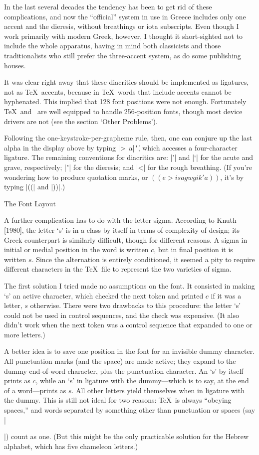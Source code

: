 In the last several decades the tendency has been to get rid of these
complications, and now the ``official'' system in use in Greece includes
only one accent and the dieresis, without breathings or iota subscripts.
Even though I work primarily with modern Greek, however, I thought
it short-sighted not to include the whole apparatus, having in mind
both classicists and those traditionalists who
still prefer the three-accent system, as do some publishing houses.

It was clear right away that these diacritics should be implemented as
ligatures, not as \TeX\ accents, because in \TeX\ words that include
accents cannot be hyphenated.  This implied that 128 font
positions were not enough.   Fortunately \TeX\ and \MF\ are
well equipped to handle 256-position fonts, though most device
drivers are not (see the section `Other Problems').

Following the one-keystroke-per-grapheme rule, then, one can conjure
up the last alpha in the display above by typing |>~a|{\tt\char`\|},
which accesses a four-character ligature.  The remaining conventions
for diacritics are: |'| and |`| for the acute and grave, respectively;
|"| for the dieresis; and |<| for the rough breathing.  (If you're
wondering how to produce quotation marks, or $((e>isagwgik'a))$,
it's by typing |((| and |))|.)

\heading The Font Layout \endheading

A further complication has to do with the letter sigma.  According to
Knuth [1980], the letter `s' is in a class by itself in terms of
complexity of design; its Greek counterpart is similarly difficult, though
for different reasons.  A sigma in initial or medial position in the word
is written $c$, but in final position it is written $s$.  Since the
alternation is entirely conditioned, it seemed a pity to require different
characters in the \TeX\ file to represent the two varieties of sigma.

The first solution I tried made no assumptions on the font.  It
consisted in making `s' an active character, which checked the next
token and printed $c$ if it was a letter, $s$ otherwise.  There were
two drawbacks to this procedure: the letter `s' could not be used
in control sequences, and the check was expensive.  (It also didn't
work when the next token was a control sequence that expanded to one
or more letters.)

A better idea is to save one position in the font for an
invisible dummy character.  All punctuation marks (and the space)
are made active; they expand to the dummy end-of-word character,
plus the punctuation character.  An `s' by itself prints as $c$,
while an `s' in ligature with the dummy---which is to say, at the end
of a word---prints as $s$.  All other letters yield themselves when
in ligature with the dummy.  This is still not ideal for two reasons:
\TeX\ is always ``obeying spaces,'' and words separated by something
other than punctuation or spaces (say |\par|) count as one.  (But
this might be the only practicable solution for the Hebrew alphabet,
which has five chameleon letters.)

